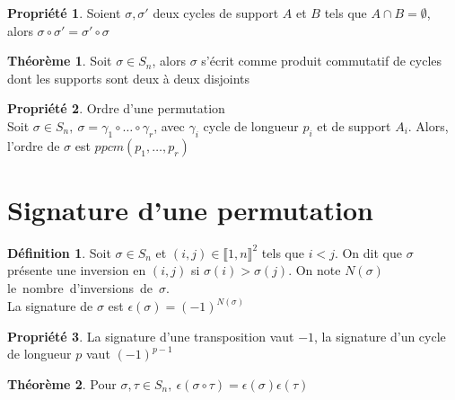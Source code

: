 \documentclass[fleqn]{article}
\theoremstyle{definition} \newtheorem*{defi}{D\'efinition}
\theoremstyle{definition} \newtheorem*{theo}{Th\'eor\`eme}
\theoremstyle{definition} \newtheorem*{coro}{Corollaire}
\theoremstyle{definition} \newtheorem*{nota}{Notation}
\theoremstyle{definition} \newtheorem*{vocab}{Vocabulaire}
\theoremstyle{remark} \newtheorem*{rqs}{Remarques}
\theoremstyle{definition} \newtheorem*{prop}{Propri\'et\'e}
\begin{document}
\begin{prop}
	Soient $\sigma, \sigma'$ deux cycles de support $A$ et $B$ tels que $A \cap B = \emptyset$, alors $\sigma \circ \sigma' = \sigma'
	\circ \sigma$
\end{prop}

\begin{theo}
	Soit $\sigma \in S_n$, alors $\sigma$ s'\'ecrit comme produit commutatif de cycles dont les supports sont deux \`a deux disjoints
\end{theo}

\begin{prop} Ordre d'une permutation\\
	Soit $\sigma \in S_n,\ \sigma = \gamma_1 \circ \hdots \circ \gamma_r$, avec $\gamma_i$ cycle de longueur $p_i$ et de support $A_i$. Alors,
	l'ordre de $\sigma$ est $ppcm(p_1, \hdots, p_r)$
\end{prop}

\section{Signature d'une permutation}
\begin{defi}
	Soit $\sigma \in S_n$ et $(i,j) \in \llbracket 1,n \rrbracket ^2$ tels que $i < j$. On dit que $\sigma$ pr\'esente une inversion en $(i,j)$ si $\sigma(i)
	> \sigma(j)$. On note $N(\sigma)$ \mbox{le nombre d'inversions de $\sigma$.}\\
	La signature de $\sigma$ est $\epsilon(\sigma) = (-1)^{N(\sigma)}$
\end{defi}

\begin{prop}
	La signature d'une transposition vaut $-1$, la signature d'un cycle de longueur $p$ vaut $(-1)^{p-1}$
\end{prop}

\begin{theo}
	Pour $\sigma, \tau \in S_n,\ \epsilon(\sigma \circ \tau) = \epsilon(\sigma) \epsilon(\tau)$
\end{theo}
\end{document}
